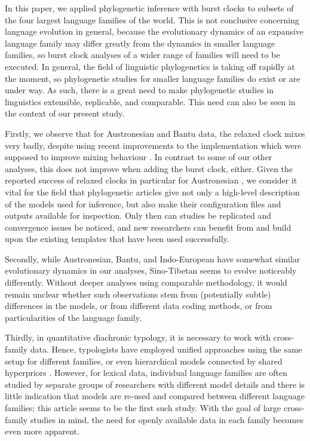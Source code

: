 \documentclass[]{rsos}%
\begin{document}
In this paper, we applied phylogenetic inference with burst clocks to subsets of the four largest language families of the world. This is not conclusive concerning language evolution in general, because the evolutionary dynamics of an expansive language family may differ greatly from the dynamics in smaller language families, so burst clock analyses of a wider range of families will need to be executed.
In general, the field of linguistic phylogenetics is taking off rapidly at the moment, so phylogenetic studies for smaller language families do exist or are under way.
As such, there is a great need to make phylogenetic studies in linguistics
extensible, replicable, and comparable. This need can also be seen in the context of
our present study.

Firstly, we observe that for
Austronesian and Bantu data, the relaxed clock mixes very badly, despite using
recent improvements to the implementation which were supposed to improve mixing
behaviour \parencite{orc}. 
In contrast to some of our other analyses, this does not improve when adding the burst clock, either. Given the reported success
of relaxed clocks in particular for Austronesian \parencite{gray2009language},
we consider it vital for the
field that phylogenetic articles give not only a high-level description of the
models used for inference, but also make their configuration files and outputs
available for inspection.
Only then can studies be replicated and convergence issues be noticed, and
new researchers can benefit from and build upon the existing templates that
have been used successfully.

Secondly, while Austronesian, Bantu, and
Indo-European have somewhat similar evolutionary dynamics in our analyses, Sino-Tibetan
seems to evolve noticeably differently. Without deeper analyses using comparable methodology, it would remain
unclear whether such observations stem from (potentially subtle)
differences in the models, or from different data coding
methods, or from particularities of the language family.

Thirdly, in quantitative diachronic typology, it is necessary to work with cross-family
data. Hence, typologists have employed unified approaches using the same setup for different families, or even hierarchical models connected by shared hyperpriors \parencite{dunn2011evolved,jager2021phylogenetic}. However, for lexical
data, individual language families are often studied by separate groups of
researchers with different model details and there is little indication that
models are re-used and compared between different language families; this article seems to be the first such study. With the goal of large cross-family studies in mind, the need for openly available data in each family becomes even more apparent.
\end{document}
